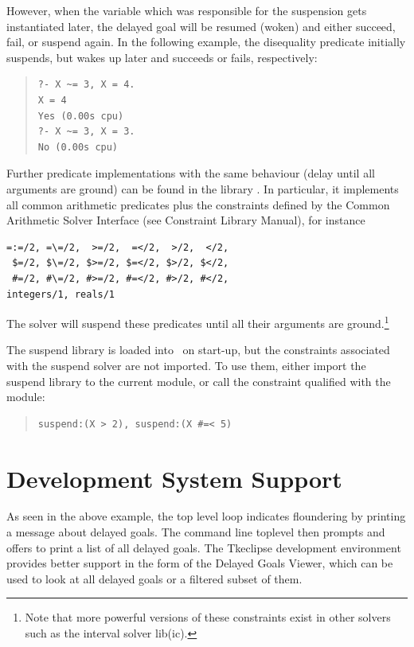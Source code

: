 However, when the variable which was responsible for the suspension gets
instantiated
later, the delayed goal will be resumed (woken) and either succeed, fail, or
suspend again. In the following example, the disequality predicate initially
suspends, but wakes up later and succeeds or fails, respectively:
\begin{quote}
\begin{verbatim}
?- X ~= 3, X = 4.
X = 4
Yes (0.00s cpu)
?- X ~= 3, X = 3.
No (0.00s cpu)
\end{verbatim}
\end{quote}


\label{suspendsolver}
Further predicate implementations with the same behaviour (delay until
all arguments are ground) can be found in the  library
.
In particular, it implements all common arithmetic predicates plus
the constraints defined by the Common Arithmetic Solver Interface
(see Constraint Library Manual), for instance
\begin{verbatim}
=:=/2, =\=/2,  >=/2,  =</2,  >/2,  </2,
 $=/2, $\=/2, $>=/2, $=</2, $>/2, $</2,
 #=/2, #\=/2, #>=/2, #=</2, #>/2, #</2,
integers/1, reals/1
\end{verbatim}
The solver will suspend these predicates until all their arguments
are ground.\footnote{
Note that more powerful versions of these constraints exist in other
solvers such as the interval solver lib(ic).}

The suspend library is loaded into \eclipse\ on start-up, but the
constraints associated with the suspend solver are not imported.
To use them, either import the suspend library to the current module,
or call the constraint qualified with the module:
\begin{quote}
\begin{verbatim}
suspend:(X > 2), suspend:(X #=< 5)
\end{verbatim}
\end{quote}



\section{Development System Support}

As seen in the above example, the  top level loop
indicates floundering by printing a message about delayed goals.
The command line toplevel then prompts and offers to print a list of
all delayed goals.
The Tkeclipse development environment provides better support in the form
of the Delayed Goals Viewer, which can be used to look at all delayed goals
or a filtered subset of them.

